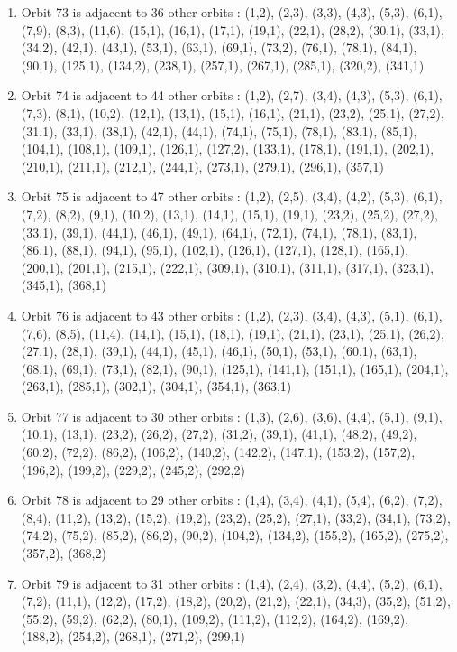 \documentclass[12pt]{article}
\begin{document}
\begin{enumerate}
\item Orbit 73 is adjacent to 36 other orbits : (1,2), (2,3), (3,3), (4,3), (5,3), (6,1), (7,9), (8,3), (11,6), (15,1), (16,1), (17,1), (19,1), (22,1), (28,2), (30,1), (33,1), (34,2), (42,1), (43,1), (53,1), (63,1), (69,1), (73,2), (76,1), (78,1), (84,1), (90,1), (125,1), (134,2), (238,1), (257,1), (267,1), (285,1), (320,2), (341,1)
\item Orbit 74 is adjacent to 44 other orbits : (1,2), (2,7), (3,4), (4,3), (5,3), (6,1), (7,3), (8,1), (10,2), (12,1), (13,1), (15,1), (16,1), (21,1), (23,2), (25,1), (27,2), (31,1), (33,1), (38,1), (42,1), (44,1), (74,1), (75,1), (78,1), (83,1), (85,1), (104,1), (108,1), (109,1), (126,1), (127,2), (133,1), (178,1), (191,1), (202,1), (210,1), (211,1), (212,1), (244,1), (273,1), (279,1), (296,1), (357,1)
\item Orbit 75 is adjacent to 47 other orbits : (1,2), (2,5), (3,4), (4,2), (5,3), (6,1), (7,2), (8,2), (9,1), (10,2), (13,1), (14,1), (15,1), (19,1), (23,2), (25,2), (27,2), (33,1), (39,1), (44,1), (46,1), (49,1), (64,1), (72,1), (74,1), (78,1), (83,1), (86,1), (88,1), (94,1), (95,1), (102,1), (126,1), (127,1), (128,1), (165,1), (200,1), (201,1), (215,1), (222,1), (309,1), (310,1), (311,1), (317,1), (323,1), (345,1), (368,1)
\item Orbit 76 is adjacent to 43 other orbits : (1,2), (2,3), (3,4), (4,3), (5,1), (6,1), (7,6), (8,5), (11,4), (14,1), (15,1), (18,1), (19,1), (21,1), (23,1), (25,1), (26,2), (27,1), (28,1), (39,1), (44,1), (45,1), (46,1), (50,1), (53,1), (60,1), (63,1), (68,1), (69,1), (73,1), (82,1), (90,1), (125,1), (141,1), (151,1), (165,1), (204,1), (263,1), (285,1), (302,1), (304,1), (354,1), (363,1)
\item Orbit 77 is adjacent to 30 other orbits : (1,3), (2,6), (3,6), (4,4), (5,1), (9,1), (10,1), (13,1), (23,2), (26,2), (27,2), (31,2), (39,1), (41,1), (48,2), (49,2), (60,2), (72,2), (86,2), (106,2), (140,2), (142,2), (147,1), (153,2), (157,2), (196,2), (199,2), (229,2), (245,2), (292,2)
\item Orbit 78 is adjacent to 29 other orbits : (1,4), (3,4), (4,1), (5,4), (6,2), (7,2), (8,4), (11,2), (13,2), (15,2), (19,2), (23,2), (25,2), (27,1), (33,2), (34,1), (73,2), (74,2), (75,2), (85,2), (86,2), (90,2), (104,2), (134,2), (155,2), (165,2), (275,2), (357,2), (368,2)
\item Orbit 79 is adjacent to 31 other orbits : (1,4), (2,4), (3,2), (4,4), (5,2), (6,1), (7,2), (11,1), (12,2), (17,2), (18,2), (20,2), (21,2), (22,1), (34,3), (35,2), (51,2), (55,2), (59,2), (62,2), (80,1), (109,2), (111,2), (112,2), (164,2), (169,2), (188,2), (254,2), (268,1), (271,2), (299,1)

\end{enumerate}
\end{document}

